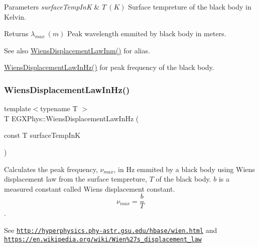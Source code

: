 \begin{DoxyParams}{Parameters}
{\em surface\+Temp\+InK} & $T\ (K)$ Surface tempreture of the black body in Kelvin. \\
\hline
\end{DoxyParams}
\begin{DoxyReturn}{Returns}
$\lambda_{max}\ (m)$ Peak wavelength emmited by black body in meters. 
\end{DoxyReturn}
\begin{DoxySeeAlso}{See also}
\mbox{\hyperlink{group___e_g_x_phys-_electrodynamics-_black_body-_wiens_displacement_law_ga126ebb146c31a2371f1d1d001d11c62f}{Wiens\+Displacement\+Law\+Inm()}} for alias. 

\mbox{\hyperlink{group___e_g_x_phys-_electrodynamics-_black_body-_wiens_displacement_law_gaf09ffbc9b7133c16da786c1609ecf689}{Wiens\+Displacement\+Law\+In\+Hz()}} for peak frequency of the black body. 
\end{DoxySeeAlso}
\mbox{\label{group___e_g_x_phys-_electrodynamics-_black_body-_wiens_displacement_law_gaf09ffbc9b7133c16da786c1609ecf689}} 
\subsubsection{\texorpdfstring{Wiens\+Displacement\+Law\+In\+Hz()}{WiensDisplacementLawInHz()}}
{\footnotesize\ttfamily template$<$typename T $>$ \\
T E\+G\+X\+Phys\+::\+Wiens\+Displacement\+Law\+In\+Hz (\begin{DoxyParamCaption}\item[{const T}]{surface\+Temp\+InK }\end{DoxyParamCaption})}



Calculates the peak frequency, $\nu_{max}$, in Hz emmited by a black body using Wien\textquotesingle{}s displacement law from the surface tempreture, $T$ of the black body. $b$ is a measured constant called Wien\textquotesingle{}s displacement constant. \[\nu_{max} = \dfrac{b}{T} \]. 

See \href{http://hyperphysics.phy-astr.gsu.edu/hbase/wien.html}{\tt http\+://hyperphysics.\+phy-\/astr.\+gsu.\+edu/hbase/wien.\+html} and \href{https://en.wikipedia.org/wiki/Wien%27s_displacement_law}{\tt https\+://en.\+wikipedia.\+org/wiki/\+Wien\%27s\+\_\+displacement\+\_\+law}


